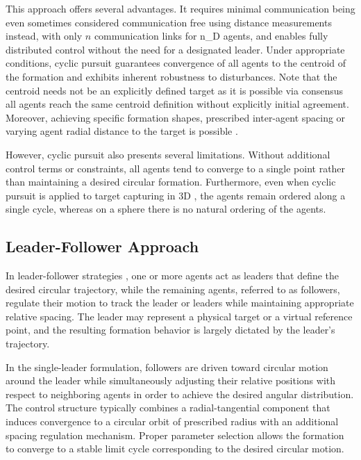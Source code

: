 This approach offers several advantages. It requires minimal communication being even sometimes considered communication free using distance measurements instead, with only $n$ communication links for \gls{n_D} agents, and enables fully distributed control without the need for a designated leader. Under appropriate conditions, cyclic pursuit guarantees convergence of all agents to the centroid of the formation and exhibits inherent robustness to disturbances. Note that the centroid needs not be an explicitly defined target as it is possible via consensus all agents reach the same centroid definition without explicitly initial agreement. Moreover, achieving specific formation shapes, prescribed inter-agent spacing or varying agent radial distance to the target is possible \cite{Jin2018,liDistributedMulticircularCircumnavigation2024,senCircumnavigationMultipleCircles2021,yaoDistributedStaticDynamic2019}.

However, cyclic pursuit also presents several limitations. Without additional control terms or constraints, all agents tend to converge to a single point rather than maintaining a desired circular formation. Furthermore, even when cyclic pursuit is applied to target capturing in \gls{3D} \cite{Kim2007}, the agents remain ordered along a single cycle, whereas on a sphere there is no natural ordering of the agents.

\subsection{Leader-Follower Approach}

In leader-follower strategies\cite{Oh2015} \cite{Litimein2021}, one or more agents act as leaders that define the desired circular trajectory, while the remaining agents, referred to as followers, regulate their motion to track the leader or leaders while maintaining appropriate relative spacing. The leader may represent a physical target or a virtual reference point, and the resulting formation behavior is largely dictated by the leader's trajectory.

In the single-leader formulation, followers are driven toward circular motion around the leader while simultaneously adjusting their relative positions with respect to neighboring agents in order to achieve the desired angular distribution. The control structure typically combines a radial-tangential component that induces convergence to a circular orbit of prescribed radius with an additional spacing regulation mechanism. Proper parameter selection allows the formation to converge to a stable limit cycle corresponding to the desired circular motion.

